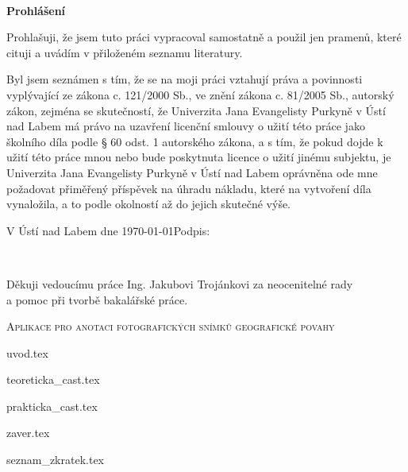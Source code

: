 \documentclass[male,czech,{is_bc}]{kitheses}
\newcommand{\nazevcz}{Aplikace pro anotaci fotografických snímků 
geografické povahy
}        %
\newcommand{\vedouciDAT}{Ing. Jakubovi Trojánkovi}
\begin{document}
\clearpage
\thispagestyle{empty}
\afterpage{\nopagecolor}
~
\clearpage

\thispagestyle{empty} 
{\bfseries Prohlášení}

\vspace{0.5cm}
Prohlašuji, že jsem tuto  práci vypracoval
samostatně a použil
jen pramenů, které cituji a uvádím v přiloženém seznamu literatury.

\vspace{0.5em}

Byl jsem seznámen 
s tím, že se na moji práci vztahují práva a povinnosti vyplývající ze zákona c. 121/2000 Sb., ve znění zákona c. 81/2005 Sb., autorský zákon, zejména se skutečností, že Univerzita Jana Evangelisty Purkyně v Ústí nad Labem má právo na uzavření licenční smlouvy o užití této práce jako školního díla podle § 60 odst. 1 autorského zákona, a s tím, že pokud dojde k užití této práce mnou nebo bude poskytnuta licence o užití jinému subjektu, je Univerzita Jana Evangelisty Purkyně v Ústí nad Labem oprávněna ode mne požadovat přiměřený příspěvek na úhradu nákladu, které na vytvoření díla vynaložila, a to podle okolností až do jejich skutečné výše.

\vspace{2em}

V Ústí nad Labem dne \today   \hfill Podpis: \makebox[4cm][s]{\dotfill}

\cleardoublepage
\thispagestyle{empty}
~
\vfill

\begin{flushright}
    Děkuji vedoucímu práce \vedouciDAT{}
     za neocenitelné rady\\a pomoc při tvorbě bakalářské práce.
\end{flushright}

\cleardoublepage

\textsc{\nazevcz}



\tableofcontents

{uvod.tex}

{teoreticka_cast.tex}

{prakticka_cast.tex}

{zaver.tex}

{seznam_zkratek.tex}
\end{document}
